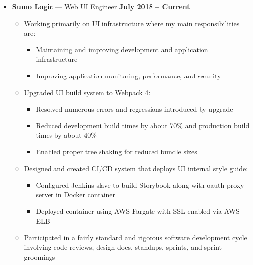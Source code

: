\documentclass[10pt, oneside]{letter}
\begin{document}
    \begin{adjustwidth}{0.1in}{0pt}

      \begin{itemize}
        \item
          \textbf{Sumo Logic} --- Web UI Engineer \hfill \textbf{July 2018 -- Current}
            \begin{itemize}
              \item{
                Working primarily on UI infrastructure where my main
                responsibilities are:
              }
                \begin{itemize}
                  \item{Maintaining and improving development and application infrastructure}
                  \item{Improving application monitoring, performance, and security}
                \end{itemize}
              \item{Upgraded UI build system to Webpack 4:}
                \begin{itemize}
                  \item{Resolved numerous errors and regressions introduced by upgrade}
                  \item{Reduced development build times by about 70\% and production build times by about 40\%}
                  \item{Enabled proper tree shaking for reduced bundle sizes}
                \end{itemize}

              \item{Designed and created CI/CD system that deploys UI internal style guide:}
                \begin{itemize}
                  \item{Configured Jenkins slave to build Storybook along with oauth proxy server in Docker container}
                  \item{Deployed container using AWS Fargate with SSL enabled via AWS ELB}
                \end{itemize}

              \item{
                Participated in a fairly standard and rigorous software development
                cycle involving code reviews, design docs, standups, sprints,
                and sprint groomings
              }


\end{itemize}
\end{itemize}
\end{adjustwidth}
\end{document}
